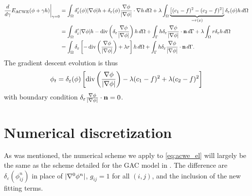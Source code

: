 \begin{align*}
\frac{d}{d\gamma}E_\textrm{ACWE}(\phi + \gamma h) \bigg\rvert_{\gamma = 0}
&= \int_{\Omega} \delta'_\varepsilon(\phi) \lvert\nabla \phi\rvert h + \delta_\varepsilon(\phi) \frac{\nabla \phi}{\lvert\nabla \phi\rvert} \cdot \nabla h \,d\Omega
+ \lambda\int_{\Omega} \underbrace{\left[(c_1 - f)^2 - (c_2 - f)^2 \right]}_{=r(x)} \delta_\varepsilon(\phi) h \,d\Omega 
\\
&= \int_{\Omega } \delta'_\varepsilon \lvert\nabla \phi\rvert h
- \operatorname{div}\left(\delta_\varepsilon\frac{\nabla \phi}{\lvert\nabla \phi\rvert}  \right)  h
\,d\Omega 
+ \int_\Gamma h\delta_\varepsilon\frac{\nabla \phi}{\lvert\nabla \phi\rvert} \cdot \mathbf{n} \,d\Gamma 
+ \lambda\int_{\Omega} r \delta_\varepsilon h \,d\Omega
\\
&= \int_{\Omega} \delta_\varepsilon\left[ 
- \operatorname{div}\left(\frac{\nabla \phi}{\lvert\nabla \phi\rvert} \right) + \lambda r
\right] h\,d\Omega 
+ \int_\Gamma h\delta_\varepsilon\frac{\nabla \phi}{\lvert\nabla \phi\rvert} \cdot \mathbf{n} \,d\Gamma. 
\end{align*}
The gradient descent evolution is thus 
\begin{align}
\phi_t 
= \delta_\varepsilon(\phi) \left[ 
\operatorname{div}\left(\frac{\nabla \phi}{\lvert\nabla \phi\rvert} \right) - \lambda (c_1 - f)^2 + \lambda (c_2 - f)^2 
\right]
\label{eq:acwe_el}
\end{align}
with boundary condition $\delta_\varepsilon 
\frac{\nabla \phi}{\lvert\nabla \phi\rvert} \cdot \mathbf{n} = 0$.


\section{Numerical discretization}
\label{sec:3.2}
As was mentioned, the numerical scheme we apply to \eqref{eq:acwe_el} will largely be the same as the scheme detailed for the GAC model in . The difference are $\delta_\varepsilon(\phi^n_{ij})$ in place of $\lvert\nabla^0 \phi^n\rvert$, $g_{ij} = 1$ for all $(i,j)$, and the inclusion of the new fitting terms.

